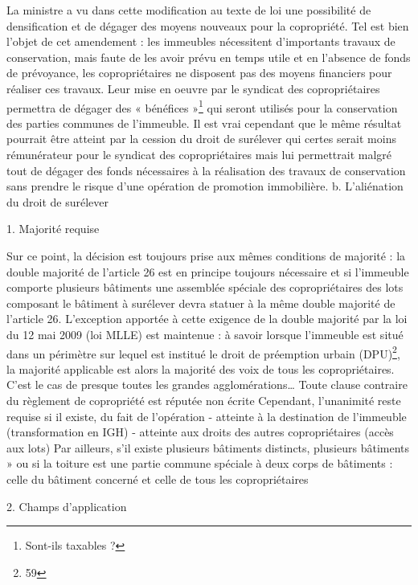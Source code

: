 	La ministre a vu dans cette modification au texte de loi une possibilité de densification et de dégager des moyens nouveaux pour la copropriété.
	Tel est bien l’objet de cet amendement : les immeubles nécessitent d’importants travaux de conservation, mais faute de les avoir prévu en temps utile et en l’absence de fonds de prévoyance, les copropriétaires ne disposent pas des moyens financiers pour réaliser ces travaux. Leur mise en oeuvre par le syndicat des copropriétaires permettra de dégager des « bénéfices »\footnote{Sont-ils taxables ?} qui seront utilisés pour la conservation des parties communes de l’immeuble.
	Il est vrai cependant que le même résultat pourrait être atteint par la cession du droit de surélever qui certes serait moins rémunérateur pour le syndicat des copropriétaires mais lui permettrait malgré tout de dégager des fonds nécessaires à la réalisation des travaux de conservation sans prendre le risque d’une opération de promotion immobilière.
	b. L’aliénation du droit de surélever
	
	1. Majorité requise
	
	Sur ce point, la décision est toujours prise aux mêmes conditions de majorité : la double majorité de l’article 26 est en principe toujours nécessaire et si l’immeuble comporte plusieurs bâtiments une assemblée spéciale des copropriétaires des lots composant le bâtiment à surélever devra statuer à la même double majorité de l’article 26.
	L’exception apportée à cette exigence de la double majorité par la loi du 12 mai 2009 (loi MLLE) est maintenue : à savoir lorsque l’immeuble est situé dans un périmètre sur lequel est institué le droit de préemption urbain (DPU)\footnote{59}, la majorité applicable est alors la majorité des voix de tous les copropriétaires. C’est le cas de presque toutes les grandes agglomérations…
	Toute clause contraire du règlement de copropriété est réputée non écrite
	Cependant, l’unanimité reste requise si il existe, du fait de l’opération
	- atteinte à la destination de l’immeuble (transformation en IGH)
	- atteinte aux droits des autres copropriétaires (accès aux lots)
	Par ailleurs, s’il existe plusieurs bâtiments distincts, plusieurs bâtiments » ou si la toiture est une partie commune spéciale à deux corps de bâtiments : celle du bâtiment concerné et celle de tous les copropriétaires
	
	2. Champs d’application
	
